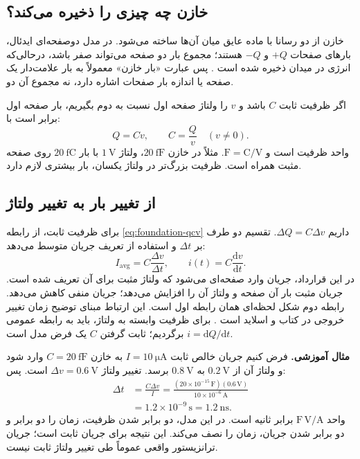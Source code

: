 \subsection{خازن چه چیزی را ذخیره می‌کند؟}
خازن از دو رسانا با ماده عایق میان آن‌ها ساخته می‌شود.
در مدل دوصفحه‌ای ایدئال، بارهای صفحات \(+Q\) و \(-Q\) هستند؛
مجموع بار دو صفحه می‌تواند صفر باشد، درحالی‌که انرژی در میدان ذخیره شده است
\cite{capacitors}. پس عبارت «بار خازن» معمولاً به بار علامت‌دار یک صفحه
یا اندازه بار صفحات اشاره دارد، نه مجموع آن دو.

اگر ظرفیت ثابت \(C\) باشد و \(v\) را ولتاژ صفحه اول نسبت به دوم بگیریم،
بار صفحه اول برابر است با:
\begin{equation}\label{eq:foundation-qcv}
Q=Cv,\qquad C=\frac{Q}{v}\quad(v\ne0).
\end{equation}
واحد ظرفیت  است و \(\mathrm{F}=\mathrm{C}/\mathrm{V}\).
مثلاً در خازن \(\qty{20}{\femto\farad}\)، ولتاژ \(\qty{1}{\volt}\)
با بار \(\qty{20}{\femto\coulomb}\) روی صفحه مثبت همراه است.
ظرفیت بزرگ‌تر در ولتاژ یکسان، بار بیشتری لازم دارد.

\subsection{از تغییر بار به تغییر ولتاژ}
برای ظرفیت ثابت، از رابطه \eqref{eq:foundation-qcv} داریم
\(\Delta Q=C\Delta v\). تقسیم دو طرف بر \(\Delta t\) و استفاده از تعریف
جریان متوسط می‌دهد:
\begin{equation}\label{eq:foundation-cap-current}
I_{\mathrm{avg}}=C\frac{\Delta v}{\Delta t},
\qquad i(t)=C\frac{\mathrm{d}v}{\mathrm{d}t}.
\end{equation}
در این قرارداد، جریان وارد صفحه‌ای می‌شود که ولتاژ مثبت برای آن تعریف شده است.
جریان مثبت بار آن صفحه و ولتاژ آن را افزایش می‌دهد؛ جریان منفی کاهش می‌دهد.
رابطه دوم شکل لحظه‌ای همان رابطه اول است. این ارتباط مبنای توضیح زمان تغییر خروجی
در کتاب و اسلاید است \cite[بخش ]{weste}\cite[اسلاید ۸]{mos}.
برای ظرفیت وابسته به ولتاژ، باید به رابطه عمومی \(i=\mathrm{d}Q/\mathrm{d}t\)
برگردیم؛ ثابت گرفتن \(C\) یک فرض مدل است.

\textbf{مثال آموزشی.} فرض کنیم جریان خالص ثابت \(I=\qty{10}{\micro\ampere}\)
به خازن \(C=\qty{20}{\femto\farad}\) وارد شود و ولتاژ آن از
\(\qty{0.2}{\volt}\) به \(\qty{0.8}{\volt}\) برسد. تغییر ولتاژ
\(\Delta v=\qty{0.6}{\volt}\) است. پس:
\begin{align*}
\Delta t&=\frac{C\Delta v}{I}
=\frac{(20\times10^{-15}\,\mathrm{F})(0.6\,\mathrm{V})}
{10\times10^{-6}\,\mathrm{A}}\\
&=1.2\times10^{-9}\,\mathrm{s}=\qty{1.2}{\nano\second}.
\end{align*}
واحد \(\mathrm{F}\,\mathrm{V}/\mathrm{A}\) برابر ثانیه است.
در این مدل، دو برابر شدن ظرفیت، زمان را دو برابر و دو برابر شدن جریان، زمان را نصف می‌کند.
این نتیجه برای جریان ثابت است؛ جریان ترانزیستور واقعی عموماً طی تغییر ولتاژ ثابت نیست.

